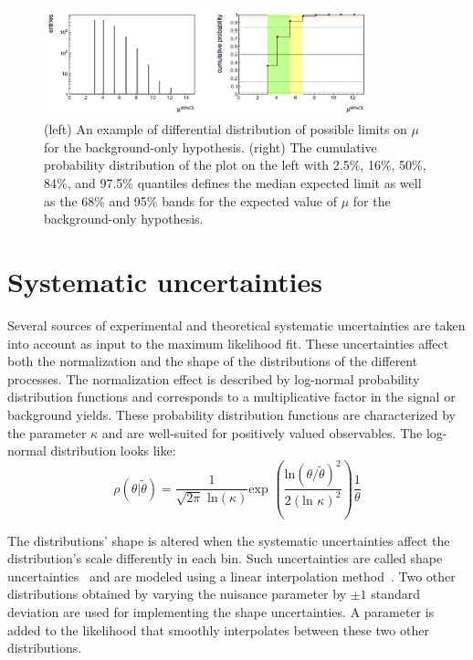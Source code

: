 \begin{figure}[!htpb]\centering
  \captionsetup{width=.87\textwidth,justification=centering}
  \includegraphics[width=0.85\textwidth]{plots/chapter8/Median.png}
  \caption{(left) An example of differential distribution of possible limits on $\mu$ for the background-only hypothesis. (right) The cumulative probability distribution of the plot on the left with 2.5\%, 16\%, 50\%, 84\%, and 97.5\% quantiles defines the median expected limit as well as the 68\% and 95\% bands for the expected value of $\mu$ for the background-only hypothesis.}
  \label{fig:median}
\end{figure}

\section{Systematic uncertainties}

Several sources of experimental and theoretical systematic uncertainties are taken into account as input to the maximum likelihood fit. These uncertainties affect both the normalization and the shape of the distributions of the different processes. The normalization effect is described by log-normal probability distribution functions and corresponds to a multiplicative factor in the signal or background yields. These probability distribution functions are characterized by the parameter $\kappa$ and are well-suited for positively valued observables. The log-normal distribution looks like:
\begin{equation}
\rho(\theta|\tilde{\theta})=\frac{1}{\sqrt{2\pi}\text{ ln}(\kappa)}\text{exp }(\frac{\text{ln}(\theta/\tilde{\theta})^2}{2(\text{ln }\kappa)^2}) \frac{1}{\theta}
\end{equation}

The distributions' shape is altered when the systematic uncertainties affect the distribution's scale differently in each bin. Such uncertainties are called shape uncertainties~\cite{Conway:2011in} and are modeled using a linear interpolation method~\cite{Read:1999kh}. Two other distributions obtained by varying the nuisance parameter by $\pm 1$ standard deviation are used for implementing the shape uncertainties. A parameter is added to the likelihood that smoothly interpolates between these two other distributions.

